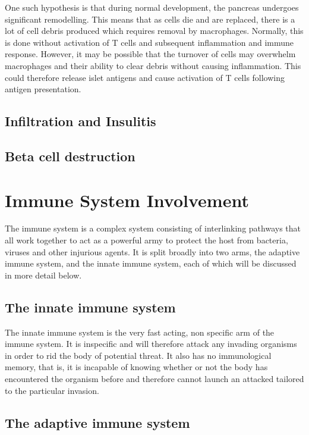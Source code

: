 One such hypothesis is that during normal development, the pancreas undergoes significant remodelling.
This means that as cells die and are replaced, there is a lot of cell debris produced which requires removal by macrophages.
Normally, this is done without activation of T cells and subsequent inflammation and immune response.
However, it may be possible that the turnover of cells may overwhelm macrophages and their ability to clear debris without causing inflammation.
This could therefore release islet antigens and cause activation of T cells following antigen presentation.

\subsection{Infiltration and Insulitis}
\subsection{Beta cell destruction}



\section{Immune System Involvement}

The immune system is a complex system consisting of interlinking pathways that all work together to act as a powerful army to protect the host from bacteria, viruses and other injurious agents.
It is split broadly into two arms, the adaptive immune system, and the innate immune system, each of which will be discussed in more detail below.


\subsection{The innate immune system}
The innate immune system is the very fast acting, non specific arm of the immune system.
It is inspecific and will therefore attack any invading organisms in order to rid the body of potential threat.
It also has no immunological memory, that is, it is incapable of knowing whether or not the body has encountered the organism before and therefore cannot launch an attacked tailored to the particular invasion.


\subsection{The adaptive immune system}

